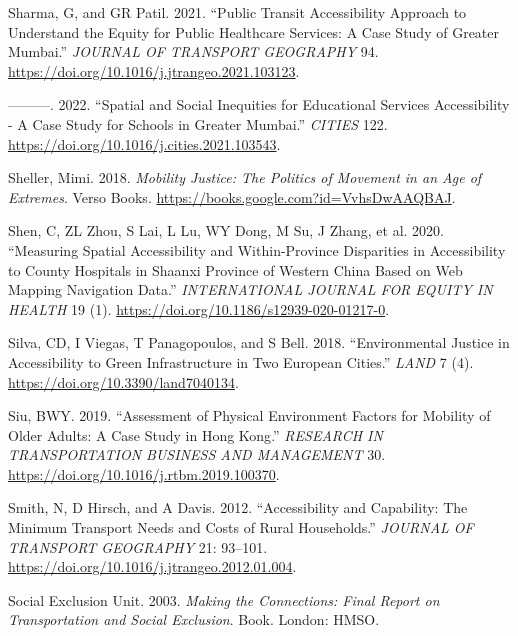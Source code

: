 \documentclass[12pt, oneside]{report}
\newlength{\cslhangindent}
\newlength{\cslentryspacingunit} %
\newenvironment{CSLReferences}[2] %
 {%
  \setlength{\parindent}{0pt}
  \ifodd #1
  \let\oldpar\par
  \def\par{\hangindent=\cslhangindent\oldpar}
  \fi
  \setlength{\parskip}{#2\cslentryspacingunit}
 }%
 {}
\begin{document}
\begin{CSLReferences}{1}{0}
\leavevmode{}%
Sharma, G, and GR Patil. 2021. {``Public Transit Accessibility Approach
to Understand the Equity for Public Healthcare Services: {A} Case Study
of {Greater Mumbai}.''} \emph{JOURNAL OF TRANSPORT GEOGRAPHY} 94.
\url{https://doi.org/10.1016/j.jtrangeo.2021.103123}.

\leavevmode{}%
---------. 2022. {``Spatial and Social Inequities for Educational
Services Accessibility - {A} Case Study for Schools in {Greater
Mumbai}.''} \emph{CITIES} 122.
\url{https://doi.org/10.1016/j.cities.2021.103543}.

\leavevmode{}%
Sheller, Mimi. 2018. \emph{Mobility {Justice}: {The Politics} of
{Movement} in an {Age} of {Extremes}}. {Verso Books}.
\url{https://books.google.com?id=VvhsDwAAQBAJ}.

\leavevmode{}%
Shen, C, ZL Zhou, S Lai, L Lu, WY Dong, M Su, J Zhang, et al. 2020.
{``Measuring Spatial Accessibility and Within-Province Disparities in
Accessibility to County Hospitals in {Shaanxi Province} of {Western
China} Based on Web Mapping Navigation Data.''} \emph{INTERNATIONAL
JOURNAL FOR EQUITY IN HEALTH} 19 (1).
\url{https://doi.org/10.1186/s12939-020-01217-0}.

\leavevmode{}%
Silva, CD, I Viegas, T Panagopoulos, and S Bell. 2018. {``Environmental
{Justice} in {Accessibility} to {Green Infrastructure} in {Two European
Cities}.''} \emph{LAND} 7 (4).
\url{https://doi.org/10.3390/land7040134}.

\leavevmode{}%
Siu, BWY. 2019. {``Assessment of Physical Environment Factors for
Mobility of Older Adults: {A} Case Study in {Hong Kong}.''}
\emph{RESEARCH IN TRANSPORTATION BUSINESS AND MANAGEMENT} 30.
\url{https://doi.org/10.1016/j.rtbm.2019.100370}.

\leavevmode{}%
Smith, N, D Hirsch, and A Davis. 2012. {``Accessibility and Capability:
The Minimum Transport Needs and Costs of Rural Households.''}
\emph{JOURNAL OF TRANSPORT GEOGRAPHY} 21: 93--101.
\url{https://doi.org/10.1016/j.jtrangeo.2012.01.004}.

\leavevmode{}%
Social Exclusion Unit. 2003. \emph{Making the Connections: Final Report
on Transportation and Social Exclusion}. Book. London: HMSO.


\end{CSLReferences}
\end{document}
